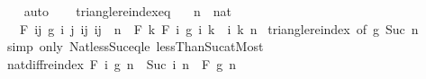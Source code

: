 \begin{isabellebody}
\ \ \isamarkupfalse%
\ auto\isanewline
\ \ \isamarkupfalse%
%
\endisatagproof
{\isafoldproof}%
%
\isadelimproof
\isanewline
%
\endisadelimproof
\isanewline
{}\isamarkupfalse%
\ triangle{\isacharunderscore}{\kern0pt}reindex{\isacharunderscore}{\kern0pt}eq{\isacharcolon}{\kern0pt}\isanewline
\ \ \ n\ {\isacharcolon}{\kern0pt}{\isacharcolon}{\kern0pt}\ nat\isanewline
\ \ \ {\isachardoublequoteopen}F\ {\isacharparenleft}{\kern0pt}{\isasymlambda}{\isacharparenleft}{\kern0pt}i{\isacharcomma}{\kern0pt}j{\isacharparenright}{\kern0pt}{\isachardot}{\kern0pt}\ g\ i\ j{\isacharparenright}{\kern0pt}\ {\isacharbraceleft}{\kern0pt}{\isacharparenleft}{\kern0pt}i{\isacharcomma}{\kern0pt}j{\isacharparenright}{\kern0pt}{\isachardot}{\kern0pt}\ i{\isacharplus}{\kern0pt}j\ {\isasymle}\ n{\isacharbraceright}{\kern0pt}\ {\isacharequal}{\kern0pt}\ F\ {\isacharparenleft}{\kern0pt}{\isasymlambda}k{\isachardot}{\kern0pt}\ F\ {\isacharparenleft}{\kern0pt}{\isasymlambda}i{\isachardot}{\kern0pt}\ g\ i\ {\isacharparenleft}{\kern0pt}k\ {\isacharminus}{\kern0pt}\ i{\isacharparenright}{\kern0pt}{\isacharparenright}{\kern0pt}\ {\isacharbraceleft}{\kern0pt}{\isachardot}{\kern0pt}{\isachardot}{\kern0pt}k{\isacharbraceright}{\kern0pt}{\isacharparenright}{\kern0pt}\ {\isacharbraceleft}{\kern0pt}{\isachardot}{\kern0pt}{\isachardot}{\kern0pt}n{\isacharbraceright}{\kern0pt}{\isachardoublequoteclose}\isanewline
%
\isadelimproof
%
\endisadelimproof
%
\isatagproof
{}\isamarkupfalse%
\ triangle{\isacharunderscore}{\kern0pt}reindex\ {\isacharbrackleft}{\kern0pt}of\ g\ {\isachardoublequoteopen}Suc\ n{\isachardoublequoteclose}{\isacharbrackright}{\kern0pt}\isanewline
{}\isamarkupfalse%
\ {\isacharparenleft}{\kern0pt}simp\ only{\isacharcolon}{\kern0pt}\ Nat{\isachardot}{\kern0pt}less{\isacharunderscore}{\kern0pt}Suc{\isacharunderscore}{\kern0pt}eq{\isacharunderscore}{\kern0pt}le\ lessThan{\isacharunderscore}{\kern0pt}Suc{\isacharunderscore}{\kern0pt}atMost{\isacharparenright}{\kern0pt}%
\endisatagproof
{\isafoldproof}%
%
\isadelimproof
\isanewline
%
\endisadelimproof
\isanewline
{}\isamarkupfalse%
\ nat{\isacharunderscore}{\kern0pt}diff{\isacharunderscore}{\kern0pt}reindex{\isacharcolon}{\kern0pt}\ {\isachardoublequoteopen}F\ {\isacharparenleft}{\kern0pt}{\isasymlambda}i{\isachardot}{\kern0pt}\ g\ {\isacharparenleft}{\kern0pt}n\ {\isacharminus}{\kern0pt}\ Suc\ i{\isacharparenright}{\kern0pt}{\isacharparenright}{\kern0pt}\ {\isacharbraceleft}{\kern0pt}{\isachardot}{\kern0pt}{\isachardot}{\kern0pt}{\isacharless}{\kern0pt}n{\isacharbraceright}{\kern0pt}\ {\isacharequal}{\kern0pt}\ F\ g\ {\isacharbraceleft}{\kern0pt}{\isachardot}{\kern0pt}{\isachardot}{\kern0pt}{\isacharless}{\kern0pt}n{\isacharbraceright}{\kern0pt}{\isachardoublequoteclose}\isanewline

\end{isabellebody}
